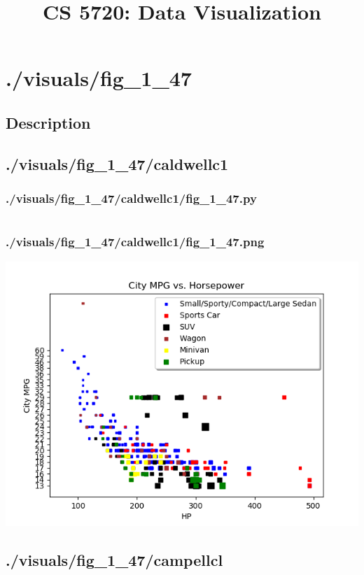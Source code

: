 \documentclass{report}
\begin{document}
    \title{CS 5720: Data Visualization}
    \maketitle
    \chapter{./visuals/fig\_1\_47}
    \section{Description}
    \small
    
    \pagebreak
    \section{./visuals/fig\_1\_47/caldwellc1}
    \subsection{./visuals/fig\_1\_47/caldwellc1/fig\_1\_47.py}
    \inputminted{python}{.././visuals/fig_1_47/caldwellc1/fig_1_47.py}
    \subsection{./visuals/fig\_1\_47/caldwellc1/fig\_1\_47.png}
    \includegraphics[width=\textwidth]{.././visuals/fig_1_47/caldwellc1/fig_1_47.png}
    \pagebreak
    \section{./visuals/fig\_1\_47/campellcl}
\end{document}
